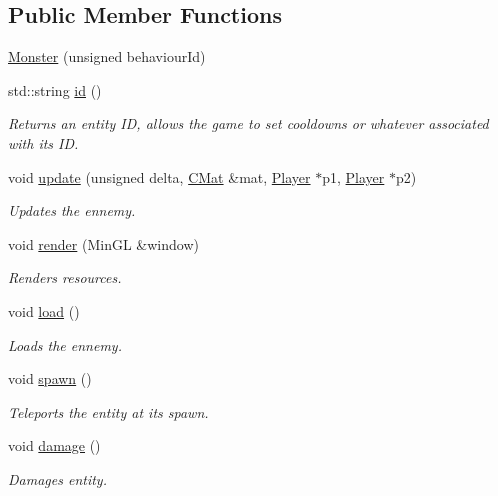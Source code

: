 \subsection*{Public Member Functions}
\begin{DoxyCompactItemize}
\item 
\hyperlink{classns_game_1_1_monster_a93d359ec069d9667352b54e3b531b4e3}{Monster} (unsigned behaviour\+Id)
\item 
std\+::string \hyperlink{classns_game_1_1_monster_a14a0c542fe9c8b6772a3984ed674c9cf}{id} ()
\begin{DoxyCompactList}\small\item\em Returns an entity ID, allows the game to set cooldowns or whatever associated with its ID. \end{DoxyCompactList}\item 
void \hyperlink{classns_game_1_1_monster_a0fa9eca417938bdbf9f12befd4531b34}{update} (unsigned delta, \hyperlink{type_8h_a64a592133575ccebb1b36453acbec02b}{C\+Mat} \&mat, \hyperlink{classns_game_1_1_player}{Player} $\ast$p1, \hyperlink{classns_game_1_1_player}{Player} $\ast$p2)
\begin{DoxyCompactList}\small\item\em Updates the ennemy. \end{DoxyCompactList}\item 
void \hyperlink{classns_game_1_1_monster_afe0b8e0d63cfef2cf0026f81facae620}{render} (Min\+GL \&window)
\begin{DoxyCompactList}\small\item\em Renders resources. \end{DoxyCompactList}\item 
void \hyperlink{classns_game_1_1_monster_a6b81ba26c3e8fae426e719be2acc4e4e}{load} ()
\begin{DoxyCompactList}\small\item\em Loads the ennemy. \end{DoxyCompactList}\item 
void \hyperlink{classns_game_1_1_monster_a6ee4a9d2cea5d327379de3416a059169}{spawn} ()
\begin{DoxyCompactList}\small\item\em Teleports the entity at its spawn. \end{DoxyCompactList}\item 
void \hyperlink{classns_game_1_1_monster_a48644849ca73888a148d6afb7eb0fa17}{damage} ()
\begin{DoxyCompactList}\small\item\em Damages entity. \end{DoxyCompactList}\end{DoxyCompactItemize}
